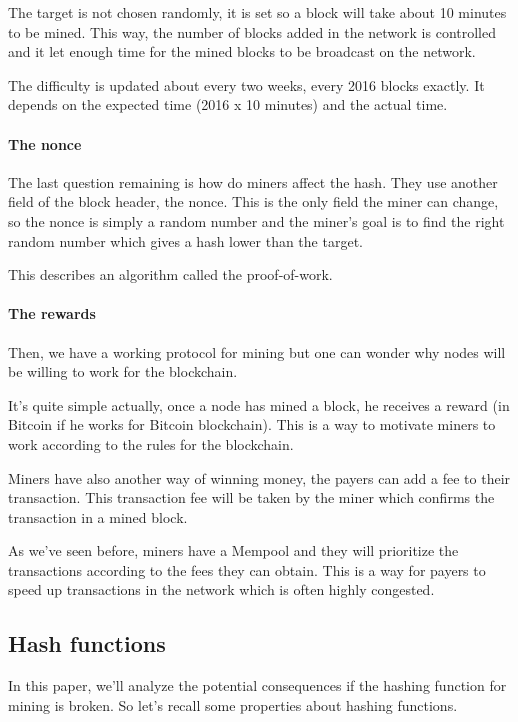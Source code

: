 The target is not chosen randomly, it is set so a block will take about 10 minutes to be mined. This way, the number of blocks added in the network is controlled and it let enough time for the mined blocks to be broadcast on the network.

The difficulty is updated about every two weeks, every 2016 blocks exactly. It depends on the expected time (2016 x 10 minutes) and the actual time.

  \paragraph{The nonce}

The last question remaining is how do miners affect the hash. They use another field of the block header, the nonce. This is the only field the miner can change, so the nonce is simply a random number and the miner's goal is to find the right random number which gives a hash lower than the target. \newline

This describes an algorithm called the proof-of-work.

  \paragraph{The rewards}

Then, we have a working protocol for mining but one can wonder why nodes will be willing to work for the blockchain.

It's quite simple actually, once a node has mined a block, he receives a reward (in Bitcoin if he works for Bitcoin blockchain). This is a way to motivate miners to work according to the rules for the blockchain. \newline

Miners have also another way of winning money, the payers can add a fee to their transaction. This transaction fee will be taken by the miner which confirms the transaction in a mined block.

As we've seen before, miners have a Mempool and they will prioritize the transactions according to the fees they can obtain. This is a way for payers to speed up transactions in the network which is often highly congested.


  \subsection{Hash functions}

In this paper, we'll analyze the potential consequences if the hashing function for mining is broken. So let's recall some properties about hashing functions. \newline

